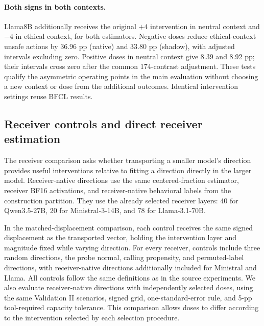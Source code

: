 \paragraph{Both signs in both contexts.}
Llama8B additionally receives the original $+4$ intervention in neutral context and $-4$ in ethical context, for both estimators. Negative doses reduce ethical-context unsafe actions by 36.96 pp (native) and 33.80 pp (shadow), with adjusted intervals excluding zero. Positive doses in neutral
context give 8.39 and 8.92 pp; their intervals cross zero after the common 174-contrast adjustment. These tests qualify the asymmetric operating points in the main evaluation without choosing a new context or dose from the additional outcomes. Identical intervention settings reuse BFCL results.



\subsection{Receiver controls and direct receiver estimation}
\label{app:receiver-controls}
The receiver comparison asks whether transporting a smaller model's direction provides useful interventions relative to fitting a direction directly in the larger model. Receiver-native directions use the same centered-fraction estimator, receiver BF16 activations, and receiver-native behavioral labels from the construction partition. They use the already
selected receiver layers: 40 for Qwen3.5-27B, 20 for Ministral-3-14B, and 78 for Llama-3.1-70B. 

In the matched-displacement comparison, each control receives the same signed displacement as the transported vector, holding the intervention layer and magnitude fixed while varying direction. For every receiver, controls include three random directions, the probe normal, calling propensity, and permuted-label directions, with receiver-native directions additionally included for Ministral and Llama. All controls follow the same definitions as in the source experiments. We also evaluate receiver-native directions with independently selected doses, using the same Validation II scenarios, signed grid, one-standard-error rule, and 5-pp tool-required capacity tolerance. This comparison allows doses to differ according to the intervention selected by each selection procedure.





